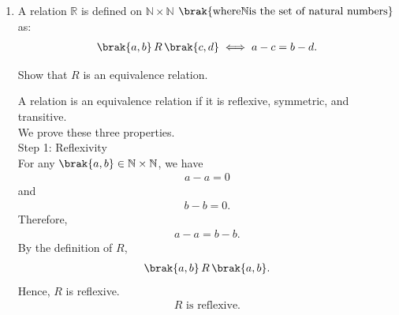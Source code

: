 \begin{enumerate}[label=\thesubsection.\arabic*, ref=\thesubsection.\theenumi]
Thus, $f:\mathbb{R}\to[-1,1]$ is onto.

\item
A relation $\mathbb{R}$ is defined on $\mathbb{N}\times\mathbb{N}$ $\brak{\text{where} \mathbb{N} \text{is the set of natural numbers}}$ as:
\begin{align}
\brak{a,b}\,R\,\brak{c,d}
\iff a-c=b-d.
\end{align}

Show that $R$ is an equivalence relation.

\solution
A relation is an equivalence relation if it is reflexive,
symmetric, and transitive.
\\We prove these three properties.
\\{Step 1: Reflexivity}
\\For any $\brak{a,b}\in\mathbb{N}\times\mathbb{N}$, we have
\begin{align}
a-a=0
\end{align}
and
\begin{align}
b-b=0.
\end{align}
Therefore,
\begin{align}
a-a=b-b.
\end{align}
By the definition of $R$,
\begin{align}
\brak{a,b}\,R\,\brak{a,b}.
\end{align}
Hence, $R$ is reflexive.
\begin{align}
R\text{ is reflexive.}
\end{align}


\end{enumerate}
